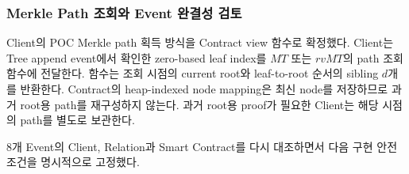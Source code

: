 \documentclass[11pt]{extarticle}
\begin{document}
\subsubsection{Merkle Path 조회와 Event 완결성 검토}

Client의 POC Merkle path 획득 방식을 Contract view 함수로 확정했다. Client는 Tree append
event에서 확인한 zero-based leaf index를 $MT$ 또는 $rvMT$의 path 조회 함수에 전달한다.
함수는 조회 시점의 current root와 leaf-to-root 순서의 sibling $d$개를 반환한다. Contract의
heap-indexed node mapping은 최신 node를 저장하므로 과거 root용 path를 재구성하지 않는다.
과거 root용 proof가 필요한 Client는 해당 시점의 path를 별도로 보관한다.

8개 Event의 Client, Relation과 Smart Contract를 다시 대조하면서 다음 구현 안전 조건을
명시적으로 고정했다.
\end{document}
